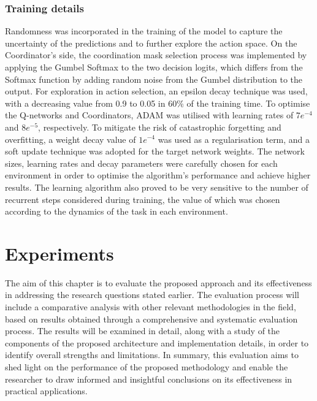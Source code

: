 \documentclass[a4paper,singleside,12pt]{report} %
\begin{document}
\subsection{Training details}\label{training-details}
Randomness was incorporated in the training of the model to capture the uncertainty of the predictions and to further explore the action space. On the Coordinator's side, the coordination mask selection process was implemented by applying the Gumbel Softmax to the two decision logits, which differs from the Softmax function by adding random noise from the Gumbel distribution to the output. For exploration in action selection, an epsilon decay technique was used, with a decreasing value from 0.9 to 0.05 in 60\% of the training time. To optimise the Q-networks and Coordinators, ADAM was utilised with learning rates of $7e^{-4}$ and $8e^{-5}$, respectively. To mitigate the risk of catastrophic forgetting and overfitting, a weight decay value of $1e^{-4}$ was used as a regularisation term, and a soft update technique was adopted for the target network weights. The network sizes, learning rates and decay parameters were carefully chosen for each environment in order to optimise the algorithm's performance and achieve higher results. The learning algorithm also proved to be very sensitive to the number of recurrent steps considered during training, the value of which was chosen according to the dynamics of the task in each environment.

\chapter{Experiments}\label{Evaluation}
The aim of this chapter is to evaluate the proposed approach and its effectiveness in addressing the research questions stated earlier. The evaluation process will include a comparative analysis with other relevant methodologies in the field, based on results obtained through a comprehensive and systematic evaluation process. The results will be examined in detail, along with a study of the components of the proposed architecture and implementation details, in order to identify overall strengths and limitations. In summary, this evaluation aims to shed light on the performance of the proposed methodology and enable the researcher to draw informed and insightful conclusions on its effectiveness in practical applications.
\end{document}
